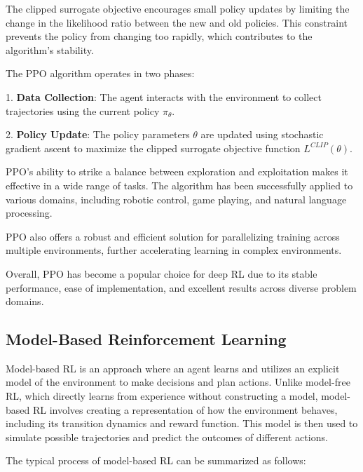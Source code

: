 The clipped surrogate objective encourages small policy updates by limiting the change in the likelihood ratio between the new and old policies. This constraint prevents the policy from changing too rapidly, which contributes to the algorithm's stability.

The PPO algorithm operates in two phases:

1.
\textbf{Data Collection}: The agent interacts with the environment to collect trajectories using the current policy \(\pi_{\theta}\).

2.
\textbf{Policy Update}: The policy parameters \(\theta\) are updated using stochastic gradient ascent to maximize the clipped surrogate objective function \(L^{CLIP}(\theta)\).

PPO's ability to strike a balance between exploration and exploitation makes it effective in a wide range of tasks. The algorithm has been successfully applied to various domains, including robotic control, game playing, and natural language processing.

PPO also offers a robust and efficient solution for parallelizing training across multiple environments, further accelerating learning in complex environments.

Overall, PPO has become a popular choice for deep RL due to its stable performance, ease of implementation, and excellent results across diverse problem domains.

\subsection{Model-Based Reinforcement Learning}\label{subsec:model-based-reinforcement-learning}
Model-based RL is an approach where an agent learns and utilizes an explicit model of the environment to make decisions and plan actions.
Unlike model-free RL, which directly learns from experience without constructing a model, model-based RL involves creating a representation of how the environment behaves, including its transition dynamics and reward function.
This model is then used to simulate possible trajectories and predict the outcomes of different actions.

The typical process of model-based RL can be summarized as follows:

